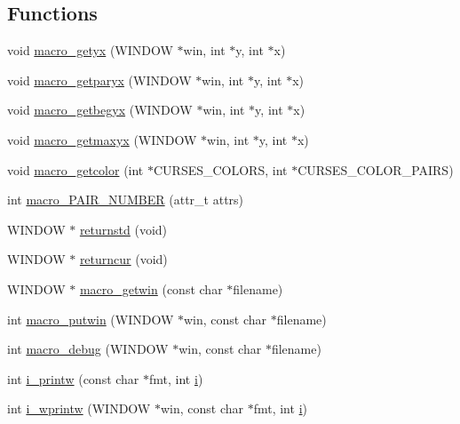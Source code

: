 \subsection*{Functions}
\begin{DoxyCompactItemize}
\item 
void \hyperlink{C-macros_8c_aec4c991cd5e4f77a97522b629ce9a35d}{macro\+\_\+getyx} (W\+I\+N\+D\+OW $\ast$win, int $\ast$y, int $\ast$x)
\item 
void \hyperlink{C-macros_8c_a43e5c2d50865008298609d40c6d6d77f}{macro\+\_\+getparyx} (W\+I\+N\+D\+OW $\ast$win, int $\ast$y, int $\ast$x)
\item 
void \hyperlink{C-macros_8c_a8e5be14f91272f8f12e72fc95b62f388}{macro\+\_\+getbegyx} (W\+I\+N\+D\+OW $\ast$win, int $\ast$y, int $\ast$x)
\item 
void \hyperlink{C-macros_8c_a649e67968f7580eb7f457eaf81344a17}{macro\+\_\+getmaxyx} (W\+I\+N\+D\+OW $\ast$win, int $\ast$y, int $\ast$x)
\item 
void \hyperlink{C-macros_8c_a7a25008dbdb05482d687f2fba917dd6a}{macro\+\_\+getcolor} (int $\ast$C\+U\+R\+S\+E\+S\+\_\+\+C\+O\+L\+O\+RS, int $\ast$C\+U\+R\+S\+E\+S\+\_\+\+C\+O\+L\+O\+R\+\_\+\+P\+A\+I\+RS)
\item 
int \hyperlink{C-macros_8c_a1529eee133fecd25ee186b9636362642}{macro\+\_\+\+P\+A\+I\+R\+\_\+\+N\+U\+M\+B\+ER} (attr\+\_\+t attrs)
\item 
W\+I\+N\+D\+OW $\ast$ \hyperlink{C-macros_8c_a764ca4a6d51c7f4ba2572e356e2c091a}{returnstd} (void)
\item 
W\+I\+N\+D\+OW $\ast$ \hyperlink{C-macros_8c_ae1f7c686646a074ab666139875a438de}{returncur} (void)
\item 
W\+I\+N\+D\+OW $\ast$ \hyperlink{C-macros_8c_ae709af03751af4c18a67fce4f7bb9549}{macro\+\_\+getwin} (const char $\ast$filename)
\item 
int \hyperlink{C-macros_8c_ab0c3eeebd7100e8c614384e42efadcd6}{macro\+\_\+putwin} (W\+I\+N\+D\+OW $\ast$win, const char $\ast$filename)
\item 
int \hyperlink{C-macros_8c_ad39de37428ca946dfb31dbcf70b74b74}{macro\+\_\+debug} (W\+I\+N\+D\+OW $\ast$win, const char $\ast$filename)
\item 
int \hyperlink{C-macros_8c_a49f96e50b927c6cc42f2f7b3c4e25a2a}{i\+\_\+printw} (const char $\ast$fmt, int \hyperlink{intro__blas1_83_8txt_a8ba82a50c0c2c12d5f6a77f7e4651c0b}{i})
\item 
int \hyperlink{C-macros_8c_a8e0a315d5abc4f7b87f2b272c20d866d}{i\+\_\+wprintw} (W\+I\+N\+D\+OW $\ast$win, const char $\ast$fmt, int \hyperlink{intro__blas1_83_8txt_a8ba82a50c0c2c12d5f6a77f7e4651c0b}{i})

\end{DoxyCompactItemize}

